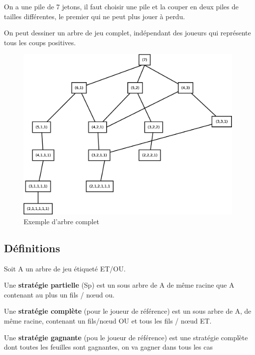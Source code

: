 \documentclass[12pt,a4paper,openany]{book}
\begin{document}
	\begin{exemple}
		 On a une pile de 7 jetons, il faut choisir une pile
		 et la couper en deux piles de tailles différentes, le
		 premier qui ne peut plus jouer à perdu.

		 On peut dessiner un arbre de jeu complet,
		 indépendant des joueurs qui représente tous les coups
		 positives.

		 \begin{figure}[H]
			 \centering
			 \includegraphics[width=15cm]{Diagramme7.eps}
			 \caption{Exemple d'arbre complet}
		 \end{figure}
	\end{exemple}
	\subsection{Définitions}
		Soit A un arbre de jeu étiqueté ET/OU.

	\begin{definition}
		Une \textbf{stratégie partielle} (Sp) est un sous arbre de A de même
		racine que A contenant au plus un fils / nœud ou.
	\end{definition}

	\begin{definition}
		Une \textbf{stratégie complète} (pour le joueur de
		référence) est 
		un sous arbre de A, de même racine, contenant un
		fils/nœud OU et tous les fils / nœud ET.
	\end{definition}

	\begin{definition}
		Une \textbf{stratégie gagnante} (pou le joueur de référence)
		est une stratégie complète dont toutes les feuilles sont
		gagnantes, on va gagner dans tous les cas 
	\end{definition}
\end{document}
